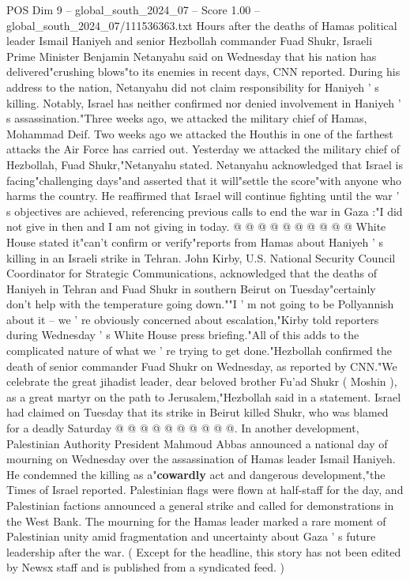 \begin{textsample}{POS Dim 9 – global\_south\_2024\_07 – Score 1.00 – global\_south\_2024\_07/111536363.txt}  \label{ex:f9_pos_109}
Hours after the deaths of Hamas political leader Ismail Haniyeh and senior Hezbollah commander Fuad Shukr, Israeli Prime Minister Benjamin Netanyahu said on Wednesday that his nation has delivered"crushing blows"to its enemies in recent days, CNN reported.
During his address to the nation, Netanyahu did not claim responsibility for Haniyeh ' s killing.
Notably, Israel has neither confirmed nor denied involvement in Haniyeh ' s assassination."Three weeks ago, we attacked the military chief of Hamas, Mohammad Deif.
Two weeks ago we attacked the Houthis in one of the farthest attacks the Air Force has carried out.
Yesterday we attacked the military chief of Hezbollah, Fuad Shukr,"Netanyahu stated.
Netanyahu acknowledged that Israel is facing"challenging days"and asserted that it will"settle the score"with anyone who harms the country.
He reaffirmed that Israel will continue fighting until the war ' s objectives are achieved, referencing previous calls to end the war in Gaza :"I did not give in then and I am not giving in today. @ @ @ @ @ @ @ @ @ @ White House stated it"can't confirm or verify"reports from Hamas about Haniyeh ' s killing in an Israeli strike in Tehran.
John Kirby, U.S.
National Security Council Coordinator for Strategic Communications, acknowledged that the deaths of Haniyeh in Tehran and Fuad Shukr in southern Beirut on Tuesday"certainly don't help with the temperature going down.""I ' m not going to be Pollyannish about it -- we ' re obviously concerned about escalation,"Kirby told reporters during Wednesday ' s White House press briefing."All of this adds to the complicated nature of what we ' re trying to get done."Hezbollah confirmed the death of senior commander Fuad Shukr on Wednesday, as reported by CNN."We celebrate the great jihadist leader, dear beloved brother Fu'ad Shukr ( Moshin ), as a great martyr on the path to Jerusalem,"Hezbollah said in a statement.
Israel had claimed on Tuesday that its strike in Beirut killed Shukr, who was blamed for a deadly Saturday @ @ @ @ @ @ @ @ @ @.
In another development, Palestinian Authority President Mahmoud Abbas announced a national day of mourning on Wednesday over the assassination of Hamas leader Ismail Haniyeh.
He condemned the killing as a"\textbf{cowardly} act and dangerous development,"the Times of Israel reported.
Palestinian flags were flown at half-staff for the day, and Palestinian factions announced a general strike and called for demonstrations in the West Bank.
The mourning for the Hamas leader marked a rare moment of Palestinian unity amid fragmentation and uncertainty about Gaza ' s future leadership after the war. ( Except for the headline, this story has not been edited by Newsx staff and is published from a syndicated feed. )

\end{textsample}
